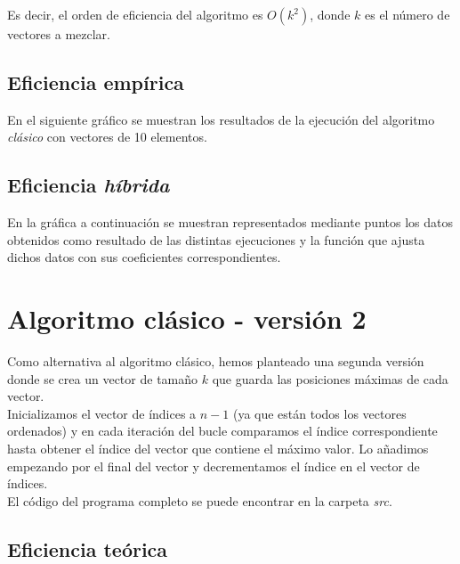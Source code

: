 \documentclass[11pt]{article}
\begin{document}
Es decir, el orden de eficiencia del algoritmo es $O(k^2)$, donde $k$ es el número de vectores a mezclar.

\subsection*{Eficiencia empírica}

En el siguiente gráfico se muestran los resultados de la
ejecución del algoritmo \textit{clásico} con vectores de 10 elementos.

\begin{center}
	
\end{center}

\subsection*{Eficiencia \textit{híbrida}}
En la gráfica a continuación se muestran representados mediante puntos los datos obtenidos como resultado de las distintas ejecuciones y la función que ajusta dichos datos con sus coeficientes correspondientes.
\begin{center}
	
\end{center}

\section*{Algoritmo clásico - versión 2}
 
 Como alternativa al algoritmo clásico, hemos planteado una segunda versión donde se crea un vector de tamaño $k$ que guarda las posiciones máximas de cada vector.\\
 
Inicializamos el vector de índices a $n - 1$ (ya que están todos los vectores ordenados) y en cada iteración del bucle comparamos el índice correspondiente hasta obtener el índice del vector que contiene el máximo valor. Lo añadimos empezando por el final del vector y decrementamos el índice en el vector de índices. \\
 
 El código del programa completo se puede encontrar en la carpeta \textit{src}.\\
 
 
 
 \subsection*{Eficiencia teórica}
 
\end{document}
